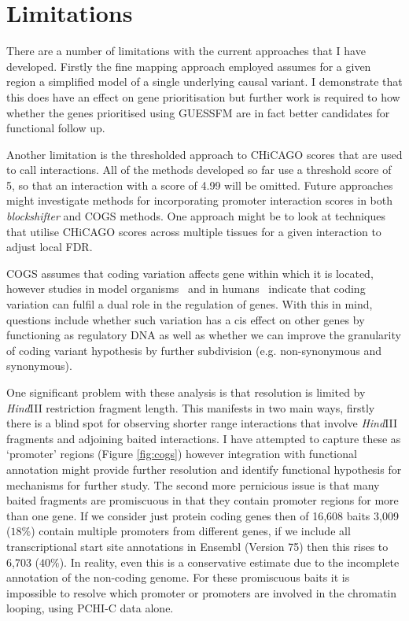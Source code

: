 \documentclass[a4paper,11pt]{report}
\begin{document}
\section{Limitations}
There are a number of limitations with the current approaches that I have developed. Firstly the fine mapping approach employed assumes for a given region a simplified model of a single underlying causal variant. I demonstrate that this does have an effect on gene prioritisation but further work is required to how whether the genes prioritised using GUESSFM are in fact better candidates for functional follow up.

Another limitation is the thresholded approach to CHiCAGO scores that are used to call interactions. All of the methods developed so far use a threshold score of 5, so that an interaction with a score of 4.99 will be omitted. Future approaches might investigate methods for incorporating promoter interaction scores in both \textit{blockshifter} and COGS methods. One approach might be to look at techniques that utilise CHiCAGO scores across multiple tissues for a given interaction to adjust local FDR. 

COGS assumes that coding variation affects gene within which it is located, however studies in model organisms~\citep{LawrieMesserHershbergEtAl2013} and in humans~\citep{StergachisHaugenShaferEtAl2013} indicate that coding variation can fulfil a dual role in the regulation of genes. With this in mind, questions include whether such variation has a cis effect on other genes by functioning as regulatory DNA as well as whether we can improve the granularity of coding variant hypothesis by further subdivision (e.g. non-synonymous and synonymous).

One significant problem with these analysis is that resolution is limited by \textit{Hind}III restriction fragment length. This manifests in two main ways, firstly there is a blind spot for observing shorter range interactions that involve \textit{Hind}III fragments and adjoining baited interactions. I have attempted to capture these as `promoter' regions (Figure \ref{fig:cogs}) however integration with functional annotation might provide further resolution and identify functional hypothesis for mechanisms for further study. The second more pernicious issue is that many baited fragments are promiscuous in that they contain promoter regions for more than one gene. If we consider just protein coding genes then of 16,608 baits 3,009 ($18\%$) contain multiple promoters from different genes, if we include all transcriptional start site annotations in Ensembl (Version 75) then this rises to 6,703 ($40\%$). In reality, even this is a conservative estimate due to the incomplete annotation of the non-coding genome. For these promiscuous baits it is impossible to resolve which promoter or promoters are involved in the chromatin looping, using PCHI-C data alone. 
\end{document}

